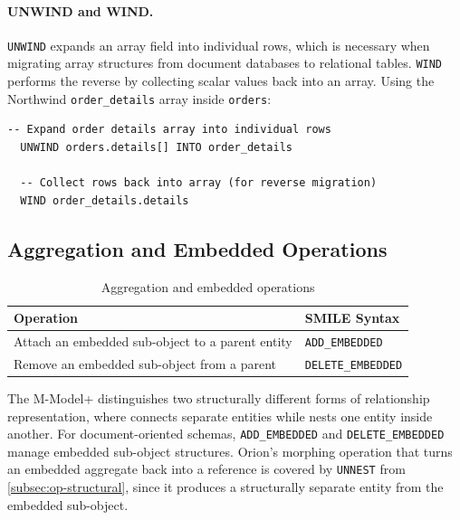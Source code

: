 \paragraph{UNWIND and WIND.}
  \texttt{UNWIND} expands an array field into individual rows, which is necessary when migrating array structures from document databases to
  relational tables. \texttt{WIND} performs the reverse by collecting scalar values back into an array. Using the Northwind \texttt{order\_details}
  array inside \texttt{orders}:

  \begin{lstlisting}[basicstyle=\small\ttfamily]
  -- Expand order details array into individual rows
  UNWIND orders.details[] INTO order_details

  -- Collect rows back into array (for reverse migration)
  WIND order_details.details
  \end{lstlisting}
\subsection{Aggregation and Embedded Operations}\label{subsec:op-embedded}
  \begin{table}[h]
  \centering
  \small
  \begin{tabular}{ll}
  \toprule
  \textbf{Operation} & \textbf{SMILE Syntax} \\
  \midrule
  Attach an embedded sub-object to a parent entity & \texttt{ADD\_EMBEDDED}    \\
  Remove an embedded sub-object from a parent      & \texttt{DELETE\_EMBEDDED} \\
  \bottomrule
  \end{tabular}
  \caption{Aggregation and embedded operations}
  \label{tab:ops-embedded}
  \end{table}

  The M-Model+ distinguishes two structurally different forms of relationship representation, where
   connects separate entities while  nests one entity inside another. For
  document-oriented schemas, \texttt{ADD\_EMBEDDED} and \texttt{DELETE\_EMBEDDED} manage embedded
  sub-object structures. Orion's morphing operation that turns an embedded aggregate back into a
  reference is covered by \texttt{UNNEST} from \autoref{subsec:op-structural}, since it produces a
  structurally separate entity from the embedded sub-object.
